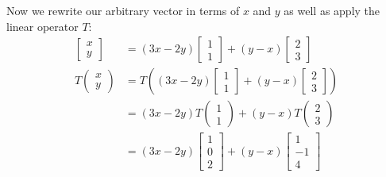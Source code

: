 \documentclass{article}
\begin{document}
Now we rewrite our arbitrary vector in terms of $x$ and $y$ as well as apply the linear operator $T$:
\begin{align*}
  \begin{bmatrix}
    x\\y
  \end{bmatrix}&=(3x-2y)\begin{bmatrix}
    1\\1
  \end{bmatrix}+(y-x)\begin{bmatrix}
    2\\3
  \end{bmatrix}\\
  T\begin{pmatrix}
    x\\y
  \end{pmatrix}
  &=T\left((3x-2y)\begin{bmatrix}
    1\\1
  \end{bmatrix}+(y-x)\begin{bmatrix}
    2\\3
  \end{bmatrix}\right)\\
  &=(3x-2y)T\begin{pmatrix}
    1\\1
  \end{pmatrix}+(y-x)T\begin{pmatrix}
    2\\3
  \end{pmatrix}\tag{linearity}\\
  &=(3x-2y)\begin{bmatrix}
    1\\0\\2
  \end{bmatrix}+(y-x)\begin{bmatrix}
    1\\-1\\4
  \end{bmatrix}\tag{given}
\end{align*}
\end{document}
